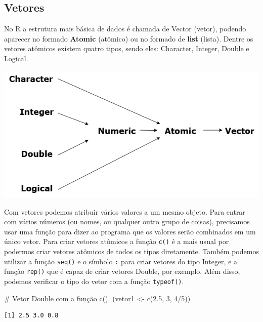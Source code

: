 \documentclass[
  letterpaper,
  DIV=11,
  numbers=noendperiod]{scrreprt}
\newenvironment{Shaded}{\begin{snugshade}}{\end{snugshade}}
\newcommand{\CommentTok}[1]{\textcolor[rgb]{0.37,0.37,0.37}{#1}}
\newcommand{\DecValTok}[1]{\textcolor[rgb]{0.68,0.00,0.00}{#1}}
\newcommand{\FloatTok}[1]{\textcolor[rgb]{0.68,0.00,0.00}{#1}}
\newcommand{\FunctionTok}[1]{\textcolor[rgb]{0.28,0.35,0.67}{#1}}
\newcommand{\NormalTok}[1]{\textcolor[rgb]{0.00,0.23,0.31}{#1}}
\newcommand{\OtherTok}[1]{\textcolor[rgb]{0.00,0.23,0.31}{#1}}
\newcommand{\SpecialCharTok}[1]{\textcolor[rgb]{0.37,0.37,0.37}{#1}}
\begin{document}
\hypertarget{vetores}{%
\subsection{Vetores}\label{vetores}}

No R a estrutura mais básica de dados é chamada de Vector (vetor),
podendo aparecer no formado \textbf{Atomic} (atômico) ou no formado de
\textbf{list} (lista). Dentre os vetores atômicos existem quatro tipos,
sendo eles: Character, Integer, Double e Logical.

\includegraphics{./figuras_tutorialR/diagram.drawio.png}

Com vetores podemos atribuir vários valores a um mesmo objeto. Para
entrar com vários números (ou nomes, ou qualquer outro grupo de coisas),
precisamos usar uma função para dizer ao programa que os valores serão
combinados em um único vetor. Para criar vetores atômicos a função
\texttt{c()} é a mais usual por podermos criar vetores atômicos de todos
os tipos diretamente. Também podemos utilizar a função \texttt{seq()} e
o símbolo \texttt{:} para criar vetores do tipo Integer, e a função
\texttt{rep()} que é capaz de criar vetores Double, por exemplo. Além
disso, podemos verificar o tipo do vetor com a função \texttt{typeof()}.

\begin{Shaded}
\begin{Highlighting}[]
\CommentTok{\# Vetor Double com a função c().}
\NormalTok{(vetor1 }\OtherTok{\textless{}{-}} \FunctionTok{c}\NormalTok{(}\FloatTok{2.5}\NormalTok{, }\DecValTok{3}\NormalTok{, }\DecValTok{4}\SpecialCharTok{/}\DecValTok{5}\NormalTok{))}
\end{Highlighting}
\end{Shaded}

\begin{verbatim}
[1] 2.5 3.0 0.8
\end{verbatim}
\end{document}
